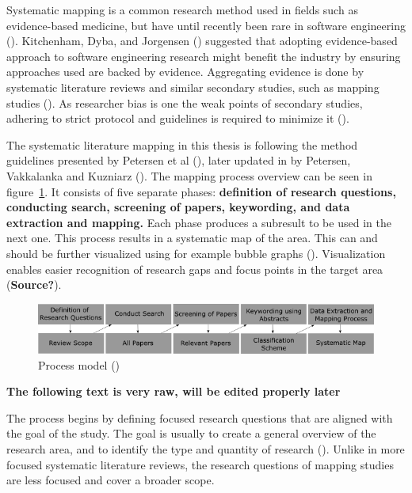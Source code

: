 \documentclass[utf8,english]{gradu3}
\begin{document}
Systematic mapping is a common research method used in fields such as
evidence-based medicine, but have until recently been rare in software
engineering (\cite{petersen2008}). Kitchenham, Dyba, and Jorgensen
(\cite{kitchenham2004}) suggested that adopting evidence-based approach to
software engineering research might benefit the industry by ensuring approaches
used are backed by evidence. Aggregating evidence is done by systematic
literature reviews and similar secondary studies, such as mapping studies
(\cite{kitchenham2010}). As researcher bias is one the weak points of secondary
studies, adhering to strict protocol and guidelines is required to minimize it
(\cite{brereton2007}).


The systematic literature mapping in this thesis is following the method
guidelines presented by Petersen et al (\cite*{petersen2008}), later updated in
by Petersen, Vakkalanka and Kuzniarz (\cite*{petersen2015}). The mapping process
overview can be seen in figure~\ref{fig:mapping}. It consists of five separate
phases: \textbf{definition of research questions, conducting search, screening of
papers, keywording, and data extraction and mapping.} Each phase produces a
subresult to be used in the next one. This process results in a systematic map
of the area. This can and should be further visualized using for example bubble
graphs (\cite{petersen2008}). Visualization enables easier recognition of 
research gaps and focus points in the target area (\textbf{Source?}).


\begin{figure}[h]
  \includegraphics[width=\linewidth]{images/method_graph_L.png}
  \caption{Process model (\cite{petersen2008})}
  \label{fig:mapping}
\end{figure}

\textbf{The following text is very raw, will be edited properly later}

The process begins by defining focused research questions that are aligned with
the goal of the study. The goal is usually to create a general overview of the
research area, and to identify the type and quantity of research
(\cite{petersen2008}). 
Unlike in more focused systematic literature reviews, the
research questions of mapping studies are less focused and cover a broader
scope.
\end{document}
